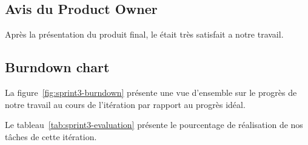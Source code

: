 \subsection{Avis du Product Owner}

Après la présentation du produit final, le  était très
satisfait a notre travail.

\subsection{Burndown chart}

La figure~\ref{fig:sprint3-burndown} présente une vue d'ensemble sur le progrès
de notre travail au cours de l'itération par rapport au progrès idéal.



Le tableau~\ref{tab:sprint3-evaluation} présente le pourcentage de réalisation
de nos tâches de cette itération.

